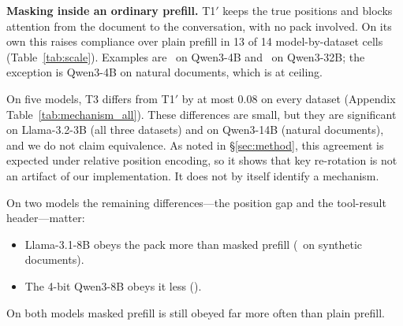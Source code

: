 \documentclass[10pt]{article}
\newcommand{\cond}[1]{\textsf{#1}}
\begin{document}
\textbf{Masking inside an ordinary prefill.} \cond{T1$'$} keeps the true positions and blocks attention from the document to the
conversation, with no pack involved. On its own this raises compliance over plain prefill in 13 of 14 model-by-dataset cells
(Table~\ref{tab:scale}). Examples are \ScaleSynDMaskTextFour\ on Qwen3-4B and \ScaleNatDMaskTextThirtyTwo\ on Qwen3-32B; the
exception is Qwen3-4B on natural documents, which is at ceiling.

On five models, \cond{T3} differs from \cond{T1$'$} by at most 0.08 on every dataset (Appendix Table~\ref{tab:mechanism_all}). These
differences are small, but they are significant on Llama-3.2-3B (all three datasets) and on Qwen3-14B (natural documents), and we do
not claim equivalence. As noted in \S\ref{sec:method}, this agreement is expected under relative position encoding, so it
shows that key re-rotation is not an artifact of our implementation. It does not by itself identify a mechanism.

On two models the remaining differences---the position gap and the tool-result header---matter:
\begin{itemize}
\item Llama-3.1-8B obeys the pack more than masked prefill (\ScaleSynDMaskLlamaEight\ on synthetic documents).
\item The 4-bit Qwen3-8B obeys it less (\ScaleSynDMaskEightQ).
\end{itemize}
On both models masked prefill is still obeyed far more often than plain prefill.
\end{document}
